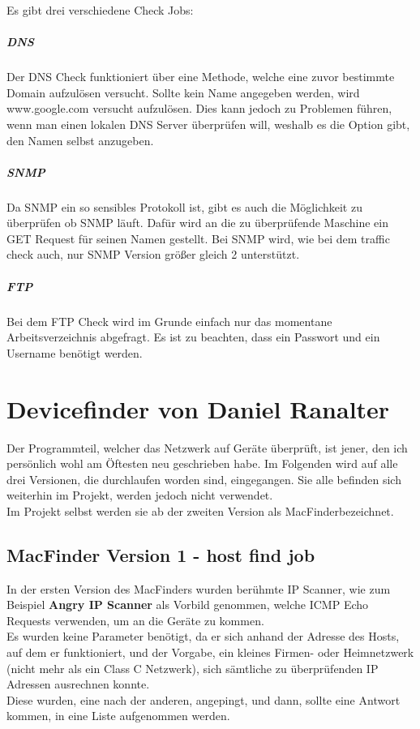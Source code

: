 \documentclass[12pt,a4paper]{report}
\begin{document}
\begin{onehalfspace}
Es gibt drei verschiedene Check Jobs:\\
\paragraph{DNS}
Der DNS Check funktioniert über eine Methode, welche eine zuvor bestimmte Domain aufzulösen versucht. Sollte kein Name angegeben werden, wird www.google.com versucht aufzulösen. Dies kann jedoch zu Problemen führen, wenn man einen lokalen DNS Server überprüfen will, weshalb es die Option gibt, den Namen selbst anzugeben.

\paragraph{SNMP}
Da SNMP ein so sensibles Protokoll ist, gibt es auch die Möglichkeit zu überprüfen ob SNMP läuft. Dafür wird an die zu überprüfende Maschine ein GET Request für seinen Namen gestellt. Bei SNMP wird, wie bei dem traffic check auch, nur SNMP Version größer gleich 2 unterstützt.

\paragraph{FTP}
Bei dem FTP Check wird im Grunde einfach nur das momentane Arbeitsverzeichnis abgefragt. Es ist zu beachten, dass ein Passwort und ein Username benötigt werden. 

\chapter{Devicefinder von Daniel Ranalter}
Der Programmteil, welcher das Netzwerk auf Geräte überprüft, ist jener, den ich persönlich wohl am Öftesten neu geschrieben habe. Im Folgenden wird auf alle drei Versionen, die durchlaufen worden sind, eingegangen. Sie alle befinden sich weiterhin im Projekt, werden jedoch nicht verwendet.\\
Im Projekt selbst werden sie ab der zweiten Version als \glqq MacFinder\grqq bezeichnet. 
\section{MacFinder Version 1 - host find job}
In der ersten Version des MacFinders wurden berühmte IP Scanner, wie zum Beispiel \textbf{Angry IP Scanner} als Vorbild genommen, welche ICMP Echo Requests verwenden, um an die Geräte zu kommen.\\
Es wurden keine Parameter benötigt, da er sich anhand der Adresse des Hosts, auf dem er funktioniert, und der Vorgabe, ein kleines Firmen- oder Heimnetzwerk (nicht mehr als ein Class C Netzwerk), sich sämtliche zu überprüfenden IP Adressen ausrechnen konnte.\\
Diese wurden, eine nach der anderen, \glqq angepingt\grqq , und dann, sollte eine Antwort kommen, in eine Liste aufgenommen werden.\\


\end{onehalfspace}
\end{document}
